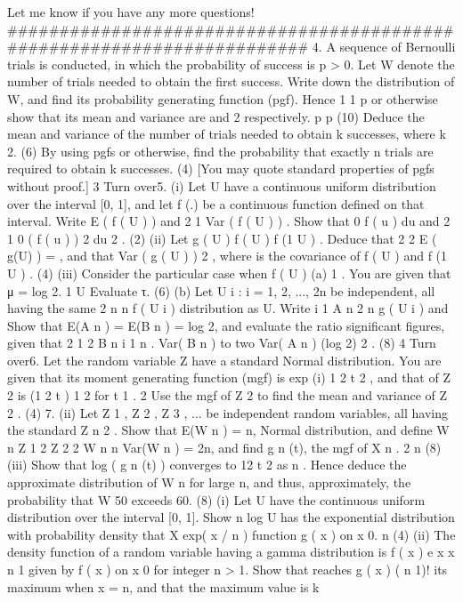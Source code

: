 Let me know if you have any more questions!
########################################################################
4.
A sequence of Bernoulli trials is conducted, in which the probability of success is
p > 0. Let W denote the number of trials needed to obtain the first success. Write
down the distribution of W, and find its probability generating function (pgf). Hence
1
1 p
or otherwise show that its mean and variance are
and 2 respectively.
p
p
(10)
Deduce the mean and variance of the number of trials needed to obtain k successes,
where k 2.
(6)
By using pgfs or otherwise, find the probability that exactly n trials are required to
obtain k successes.
(4)
[You may quote standard properties of pgfs without proof.]
3
Turn over5.
(i)
Let U have a continuous uniform distribution over the interval [0, 1], and let
f (.) be a continuous function defined on that interval. Write
E ( f ( U ) ) and
2
1
Var ( f ( U ) ) . Show that
0
f ( u ) du and
2
1
0
( f ( u ) ) 2 du
2
.
(2)
(ii)
Let g ( U )
f ( U )
f (1 U )
. Deduce that
2
2
E ( g(U) ) = , and that Var ( g ( U ) )
2
,
where is the covariance of f ( U ) and f (1 U ) .
(4)
(iii)
Consider the particular case when f ( U )
(a)
1
. You are given that μ = log 2.
1 U
Evaluate τ.
(6)
(b)
Let {U i : i = 1, 2, ..., 2n} be independent, all having the same
2 n
n
f ( U i )
distribution as U.
Write
i 1
A n
2 n
g ( U i )
and
Show that E(A n ) = E(B n ) = log 2, and evaluate the ratio
significant figures, given that
2
1
2
B n
i 1
n
.
Var( B n )
to two
Var( A n )
(log 2) 2 .
(8)
4
Turn over6.
Let the random variable Z have a standard Normal distribution. You are given that its
moment generating function (mgf) is exp
(i)
1 2
t
2
, and that of Z 2 is (1 2 t )
1
2
for t
1
.
2
Use the mgf of Z 2 to find the mean and variance of Z 2 .
(4)
7.
(ii) Let Z 1 , Z 2 , Z 3 , ... be independent random variables, all having the standard
Z n 2 . Show that E(W n ) = n,
Normal distribution, and define W n Z 1 2 Z 2 2
W n n
Var(W n ) = 2n, and find g n (t), the mgf of X n
.
2 n
(8)
(iii) Show that log ( g n (t) ) converges to 12 t 2 as n
. Hence deduce the
approximate distribution of W n for large n, and thus, approximately, the
probability that W 50 exceeds 60.
(8)
(i) Let U have the continuous uniform distribution over the interval [0, 1]. Show
n log U has the exponential distribution with probability density
that X
exp( x / n )
function g ( x )
on x 0.
n
(4)
(ii) The density function of a random variable having a gamma distribution is
f ( x )
e x x n 1
given by f ( x )
on x 0 for integer n > 1. Show that
reaches
g ( x )
( n 1)!
its maximum when x = n, and that the maximum value is k
